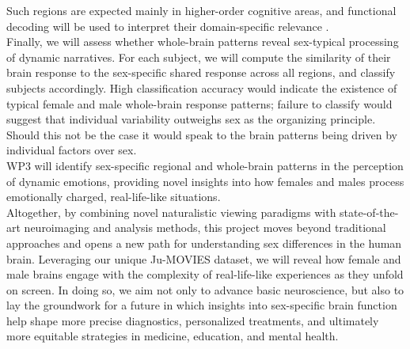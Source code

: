 \documentclass[11pt,a4paper]{article}
\begin{document}
Such regions are expected mainly in higher-order cognitive areas, and functional decoding will be
used to interpret their domain-specific relevance \parencite{foxMetaanalysisHumanNeuroimaging2014a}.\\  
Finally, we will assess whether whole-brain patterns reveal sex-typical processing of dynamic narratives. 
For each subject, we will compute the similarity of their brain response to the sex-specific shared response 
across all regions, and classify subjects accordingly. High classification accuracy would indicate 
the existence of typical female and male whole-brain response patterns; failure to classify would 
suggest that individual variability outweighs sex as the organizing principle. Should this not be the 
case it would speak to the brain patterns being driven by individual factors
over sex.\\
WP3 will identify sex-specific regional and whole-brain patterns in the perception of 
dynamic emotions, providing novel insights into how females and males process emotionally charged, 
real-life-like situations.\\  
[6pt]
Altogether, by combining novel naturalistic viewing paradigms with state-of-the-art neuroimaging and analysis methods, 
this project moves beyond traditional approaches and opens a new path for understanding sex differences 
in the human brain. Leveraging our unique Ju-MOVIES dataset, we will reveal how female and male brains engage 
with the complexity of real-life-like experiences as they unfold on screen.
In doing so, we aim not only to advance basic neuroscience, 
but also to lay the groundwork for a future in which insights into sex-specific brain 
function help shape more precise diagnostics, personalized treatments, and ultimately more equitable 
strategies in medicine, education, and mental health.

\printbibliography
\end{document}
